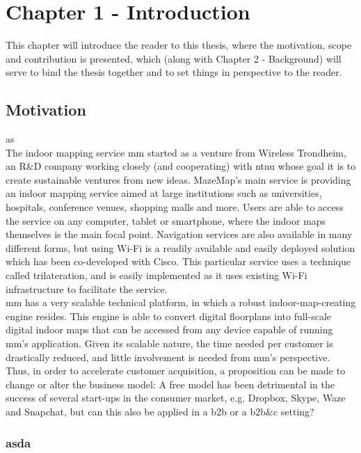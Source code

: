 \chapter{Chapter 1 - Introduction}
This chapter will introduce the reader to this thesis, where the motivation, scope and contribution is presented, which (along with Chapter 2 - Background) will serve to bind the thesis together and to set things in perspective to the reader.
\section{Motivation}
as
\newline
\\
The indoor mapping service \gls{mm} started as a venture from Wireless Trondheim, an R\&D company working closely (and cooperating) with \gls{ntnu} whose goal it is to create sustainable ventures from new ideas. MazeMap's main service is providing an indoor mapping service aimed at large institutions such as universities, hospitals, conference venues, shopping malls and more. Users are able to access the service on any computer, tablet or smartphone, where the indoor maps themselves is the main focal point. Navigation services are also available in many different forms, but using Wi-Fi is a readily available and easily deployed solution which has been co-developed with Cisco. This particular service uses a technique called trilateration\cite{BiczokMJK14}, and is easily implemented as it uses existing Wi-Fi infrastructure to facilitate the service.
\newline
\\
\gls{mm} has a very scalable technical platform, in which a robust indoor-map-creating engine resides. This engine is able to convert digital floorplans into full-scale digital indoor maps that can be accessed from any device capable of running \gls{mm}'s application. Given its scalable nature, the time needed per customer is drastically reduced, and little involvement is needed from \gls{mm}'s perspective. Thus, in order to accelerate customer acquisition, a proposition can be made to change or alter the business model: A free model has been detrimental in the success of several start-ups in the consumer market, e.g. Dropbox, Skype, Waze and Snapchat, but can this also be applied in a \gls{b2b} or a \gls{b2b&c} setting?

\subsection{asda}

